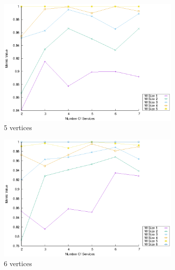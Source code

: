 \begin{figure}[!htb]
\begin{subfigure}{0.33\textwidth}
  \end{subfigure}
  \hfill
  \begin{subfigure}{0.33\textwidth}
    \includegraphics[width=\textwidth]{Images/graphs/window_quality_performance_diff_perce_n7_s7_50_89_n5}
    \caption{5 vertices}
    \label{fig:quality_window_average_perce_5n}
  \end{subfigure}
  \hfill
  \begin{subfigure}{0.33\textwidth}
    \includegraphics[width=\textwidth]{Images/graphs/window_quality_performance_diff_perce_n7_s7_50_89_n6}
    \caption{6 vertices}
    \label{fig:quality_window_average_perce_6n}
  \end{subfigure}
  \begin{subfigure}{0.33\textwidth}

\end{subfigure}
\end{figure}
